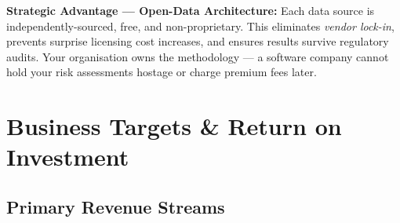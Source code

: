 \documentclass[11pt, a4paper]{article}
\begin{document}
\begin{infobox}
  \textbf{Strategic Advantage — Open-Data Architecture:} Each data source is 
  independently-sourced, free, and non-proprietary. This eliminates \textit{vendor lock-in}, prevents surprise licensing 
  cost increases, and ensures results survive regulatory audits. Your organisation owns the methodology — a software company 
  cannot hold your risk assessments hostage or charge premium fees later.
\end{infobox}

\section{Business Targets \& Return on Investment}

\subsection{Primary Revenue Streams}
\end{document}
